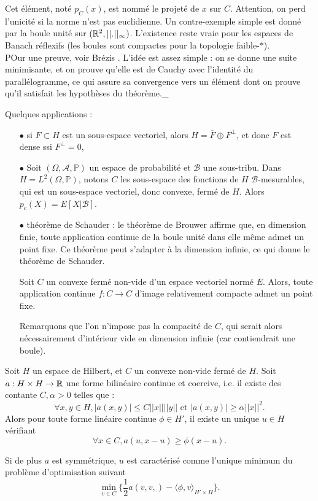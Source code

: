 Cet élément, noté $p_C(x)$, est nommé le projeté de $x$ sur $C$. Attention, on perd l'unicité si la norme n'est pas euclidienne. Un contre-exemple simple est donné par la boule unité sur $(\mathbb R^2,||.||_\infty)$. L'existence reste vraie pour les espaces de Banach réflexifs (les boules sont compactes pour la topologie faible-$*$). \\

POur une preuve, voir Brézis \cite{brezis}. L'idée est assez simple : on se donne une suite minimisante, et on prouve qu'elle est de Cauchy avec l'identité du parallélogramme, ce qui assure sa convergence vers un élément dont on prouve qu'il satisfait les hypothèses du théorème.\_

Quelques applications :\\

\begin{itemize}
\item[$\bullet$] si $F\subset H$ est un sous-espace vectoriel, alors $H= \overline F \oplus F^{\perp}$, et donc $F$ est dense ssi $F^{\perp} =0$,
\item[$\bullet$] Soit $(\Omega, \mathcal A,\mathbb P)$ un espace de probabilité et $\mathcal B$ une sous-tribu. Dans $H= L^2(\Omega, \mathbb P)$, notons $C $ les sous-espace des fonctions de $H$ $\mathcal B$-mesurables, qui est un sous-espace vectoriel, donc convexe, fermé de $H$. Alors $p_c(X)=E[X|\mathcal B]$. 
\item[$\bullet$] théorème de Schauder : le théorème de Brouwer affirme que, en dimension finie, toute application continue de la boule unité dans elle même admet un point fixe. Ce théorème peut s'adapter à la dimension infinie, ce qui donne le théorème de Schauder.\\
\begin{thm}
Soit $C$ un convexe fermé non-vide d'un espace vectoriel normé $E$. Alors, toute application continue $f : C \rightarrow C$ d'image relativement compacte admet un point fixe. 
\end{thm}
Remarquons que l'on n'impose pas la compacité de $C$, qui serait alors nécessairement d'intérieur vide en dimension infinie (car contiendrait une boule).
\end{itemize}

\begin{thm}[Stampacchia]
Soit $H$ un espace de Hilbert, et $C$ un convexe non-vide fermé de $H$. Soit $a : H\times H \rightarrow \mathbb R$ une forme bilinéaire continue et coercive, i.e. il existe des contante $C,\alpha >0$ telles que :
\[\forall x,y\in H, |a(x,y)|\leq C ||x|| ||y|| \text{ et } |a(x,y)|\geq \alpha ||x||^2.\]
Alors pour toute forme linéaire continue $\phi\in H'$, il existe un unique $u\in H$ vérifiant 
\[\forall x\in C, a(u,x-u)\geq \phi(x-u). \]

Si de plus $a$ est symmétrique, $u$ est caractérisé comme l'unique minimum du problème d'optimisation suivant
\[\min_{v\in C} \{\frac{1}{2} a(v,v,)-\langle \phi,v\rangle_{H'\times H}\}.\]
\end{thm}

